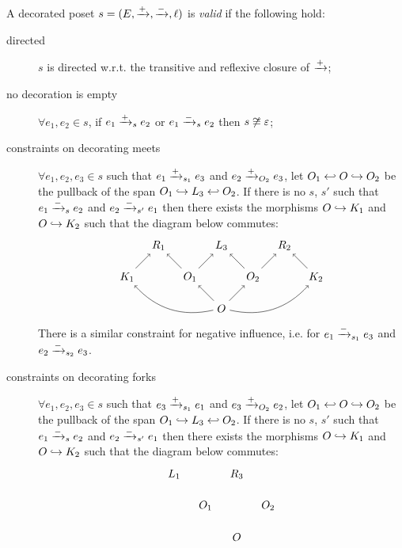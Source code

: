\begin{definition}
  \label{def:constraints_poset}
  A decorated poset $s = (E,\mathrel{\xrightarrow{+}},\mathrel{\xrightarrow{-}},\ell)$ is \emph{valid} if the following hold:
  \begin{description}
  \item[directed]
    $s$ is directed w.r.t. the transitive and reflexive closure of $\mathrel{\xrightarrow{+}}$;
  \item[no decoration is empty]
    $\forall e_1,e_2\in s$, if $e_1\mathrel{\xrightarrow{+}}_{s} e_2$ or $e_1\mathrel{\xrightarrow{-}}_{s} e_2$ then $s\not\cong\varepsilon$;
  \item[constraints on decorating meets]
    $\forall e_1,e_2,e_3\in s$ such that $e_1\mathrel{\xrightarrow{+}}_{s_1} e_3$ and $e_2\mathrel{\xrightarrow{+}}_{O_2} e_3$, let $O_1\hookleftarrow O\hookrightarrow O_2$ be the pullback of the span $O_1\hookrightarrow L_3 \hookleftarrow O_2$.
If there is no $s$, $s'$ such that $e_1\mathrel{\xrightarrow{-}}_s e_2$ and $e_2\mathrel{\xrightarrow{-}}_{s'} e_1$ then there exists the morphisms $O\hookrightarrow K_1$ and $O\hookrightarrow K_2$ such that the diagram below commutes:
    \[
    \begin{tikzpicture} %
      \node (o) at (0,-1) {\(O\)};
      \node (r3) at (0,1) {\(L_3\)};
      \node (o1) at (-1,0) {\(O_1\)};
      \node (o2) at (1,0) {\(O_2\)};
      \node (r1) at (-2,1) {\(R_1\)};
      \node (r2) at (2,1) {\(R_2\)};
      \node (k1) at (-3,0) {\(K_1\)};
      \node (k2) at (3,0) {\(K_2\)};
      \draw [->] (o) -- (o1);
      \draw [->] (o) -- (o2);
      \draw [->] (o1) -- (r3);
      \draw [->] (o2) -- (r3);
      \draw [->] (o1) -- (r1);
      \draw [->] (o2) -- (r2);
      \draw [->] (k1) -- (r1);
      \draw [->] (k2) -- (r2);
      \draw [->] (o) to [bend left] (k1);
      \draw [->] (o) to [bend right] (k2);
    \end{tikzpicture}
    \]
    There is a similar constraint for negative influence, i.e. for $e_1\mathrel{\xrightarrow{-}}_{s_1} e_3$ and $e_2\mathrel{\xrightarrow{-}}_{s_2} e_3$.
  \item[constraints on decorating forks]
    $\forall e_1,e_2,e_3\in s$ such that $e_3\mathrel{\xrightarrow{+}}_{s_1} e_1$ and $e_3\mathrel{\xrightarrow{+}}_{O_2} e_2$, let $O_1\hookleftarrow O\hookrightarrow O_2$ be the pullback of the span $O_1\hookrightarrow L_3 \hookleftarrow O_2$.
    If there is no $s$, $s'$ such that $e_1\mathrel{\xrightarrow{-}}_s e_2$ and $e_2\mathrel{\xrightarrow{-}}_{s'} e_1$ then there exists the morphisms $O\hookrightarrow K_1$ and $O\hookrightarrow K_2$ such that the diagram below commutes:
       \[
    \begin{tikzpicture} %
      \node (o) at (0,-1) {\(O\)};
      \node (r3) at (0,1) {\(R_3\)};
      \node (o1) at (-1,0) {\(O_1\)};
      \node (o2) at (1,0) {\(O_2\)};
      \node (r1) at (-2,1) {\(L_1\)};

\end{tikzpicture}\]
\end{description}
\end{definition}

